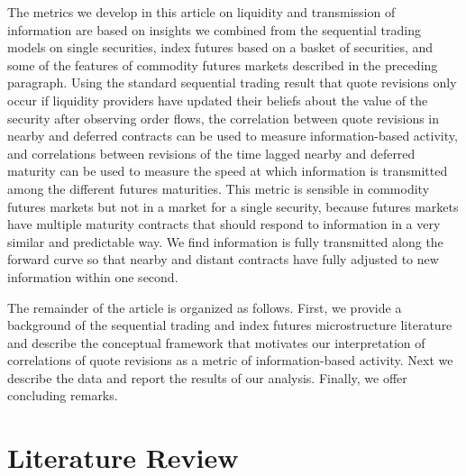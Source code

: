 \documentclass[]{elsarticle} %
\begin{document}
The metrics we develop in this article on liquidity and transmission of
information are based on insights we combined from the sequential
trading models on single securities, index futures based on a basket of
securities, and some of the features of commodity futures markets
described in the preceding paragraph. Using the standard sequential
trading result that quote revisions only occur if liquidity providers
have updated their beliefs about the value of the security after
observing order flows, the correlation between quote revisions in nearby
and deferred contracts can be used to measure information-based
activity, and correlations between revisions of the time lagged nearby
and deferred maturity can be used to measure the speed at which
information is transmitted among the different futures maturities. This
metric is sensible in commodity futures markets but not in a market for
a single security, because futures markets have multiple maturity
contracts that should respond to information in a very similar and
predictable way. We find information is fully transmitted along the
forward curve so that nearby and distant contracts have fully adjusted
to new information within one second.

The remainder of the article is organized as follows. First, we provide
a background of the sequential trading and index futures microstructure
literature and describe the conceptual framework that motivates our
interpretation of correlations of quote revisions as a metric of
information-based activity. Next we describe the data and report the
results of our analysis. Finally, we offer concluding remarks.

\section{Literature Review}\label{literature-review}
\end{document}

